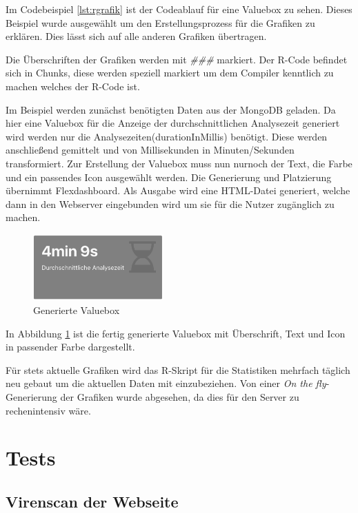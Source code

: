 Im Codebeispiel \ref{lst:rgrafik} ist der Codeablauf für eine Valuebox zu sehen. Dieses Beispiel wurde ausgewählt um den Erstellungsprozess für die Grafiken zu erklären. Dies lässt sich auf alle anderen Grafiken übertragen.

Die Überschriften der Grafiken werden mit \textit{\#\#\#} markiert. Der R-Code befindet sich in Chunks, diese werden speziell markiert um dem Compiler kenntlich zu machen welches der R-Code ist.

Im Beispiel werden zunächst benötigten Daten aus der MongoDB geladen. Da hier eine Valuebox für die Anzeige der durchschnittlichen Analysezeit generiert wird werden nur die Analysezeiten(durationInMillis) benötigt. Diese werden anschließend gemittelt und von Millisekunden in Minuten/Sekunden transformiert. Zur Erstellung der Valuebox muss nun nurnoch der Text, die Farbe und ein passendes Icon ausgewählt werden. Die Generierung und Platzierung übernimmt Flexdashboard. Als Ausgabe wird eine HTML-Datei generiert, welche dann in den Webserver eingebunden wird um sie für die Nutzer zugänglich zu machen.

\begin{figure}[H]
  \centering
  \includegraphics[width=5cm]{images/stats/valuebox}
  \caption{Generierte Valuebox}
  \label{fig:valuebox}
\end{figure}

In Abbildung \ref{fig:valuebox} ist die fertig generierte Valuebox mit Überschrift, Text und Icon in passender Farbe dargestellt.

Für stets aktuelle Grafiken wird das R-Skript für die Statistiken mehrfach täglich neu gebaut um die aktuellen Daten mit einzubeziehen. Von einer \textit{On the fly}-Generierung der Grafiken wurde abgesehen, da dies für den Server zu rechenintensiv wäre.

\section{Tests}

\subsection{Virenscan der Webseite}


